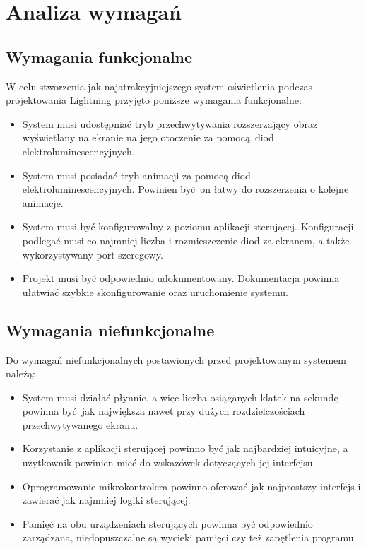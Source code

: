 \documentclass[12pt]{report}
\begin{document}
\section{Analiza wymagań}

\subsection{Wymagania funkcjonalne}

W celu stworzenia jak najatrakcyjniejszego system oświetlenia podczas projektowania Lightning przyjęto poniższe wymagania funkcjonalne:

\begin{itemize}
\item System musi udostępniać tryb przechwytywania rozszerzający obraz wyświetlany na ekranie na jego otoczenie za pomocą diod elektroluminescencyjnych.
\item System musi posiadać tryb animacji za pomocą diod elektroluminescencyjnych. Powinien być on łatwy do rozszerzenia o kolejne animacje.
\item System musi być konfigurowalny z poziomu aplikacji sterującej. Konfiguracji podlegać musi co najmniej liczba i rozmieszczenie diod za ekranem, a także wykorzystywany port szeregowy.
\item Projekt musi być odpowiednio udokumentowany. Dokumentacja powinna ułatwiać szybkie skonfigurowanie oraz uruchomienie systemu.
\end{itemize}

\subsection{Wymagania niefunkcjonalne}

Do wymagań niefunkcjonalnych postawionych przed projektowanym systemem należą:

\begin{itemize}
\item System musi działać płynnie, a więc liczba osiąganych klatek na sekundę powinna być jak największa nawet przy dużych rozdzielczościach przechwytywanego ekranu.
\item Korzystanie z aplikacji sterującej powinno być jak najbardziej intuicyjne, a użytkownik powinien mieć do wskazówek dotyczących jej interfejsu.
\item Oprogramowanie mikrokontrolera powinno oferować jak najprostszy interfejs i zawierać jak najmniej logiki sterującej.
\item Pamięć na obu urządzeniach sterujących powinna być odpowiednio zarządzana, niedopuszczalne są wycieki pamięci czy też zapętlenia programu.
\end{itemize}
\end{document}
